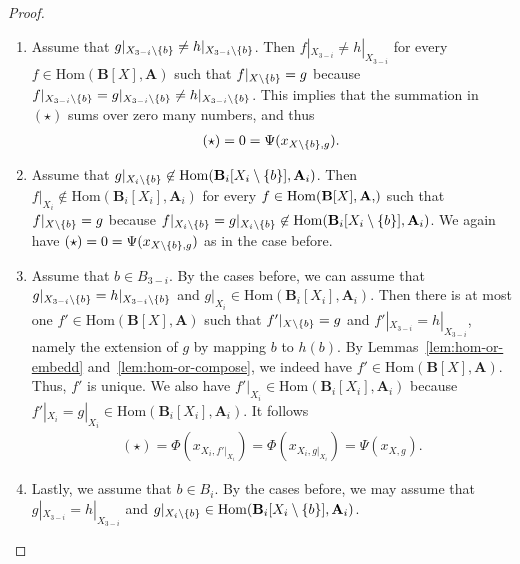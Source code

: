 \documentclass[a4paper,english, thm-restate]{lipics-v2021}
\DeclarePairedDelimiter\set{\lbrace}{\rbrace}
\newcommand{\StructA}{\mathbf{A}}
\newcommand{\StructB}{\mathbf{B}}
\newcommand{\restrict}[2]{#1|_{#2}}
\newcommand{\Hom}[2]{\mathrm{Hom}(#1,#2)}
\begin{document}
\begin{proof}
		\begin{enumerate}
			\item Assume that $\restrict{g}{X_{3-i} \setminus \set{b}} \neq \restrict{h}{X_{3-i}\setminus \set{b}}$.
			Then $\restrict{f}{X_{3-i}} \neq \restrict{h}{X_{3-i}}$
			for every $f \in \Hom{\StructB[X]}{\StructA}$ such that $\restrict{f}{X\setminus \set{b}} = g$ 
			because $\restrict{f}{X_{3-i} \setminus \set{b}} =  \restrict{g}{X_{3-i} \setminus \set{b}} \neq \restrict{h}{X_{3-i}\setminus \set{b}}$. This implies that the summation in $(\star)$ sums over zero many numbers, and thus 
			\begin{align*}
				(\star) = 0 = \Psi(x_{X\setminus \set{b}, g}).
			\end{align*}
			\item Assume that $\restrict{g}{X_i \setminus \set{b}} \not\in \Hom{\StructB_i[X_i \setminus \set{b}]}{\StructA_i}$. Then $\restrict{f}{X_i} \not\in \Hom{\StructB_i[X_i]}{\StructA_i}$
			for every  $f \in \Hom{\StructB[X], \StructA}$ such that $\restrict{f}{X\setminus\set{b}} = g$
			because $\restrict{f}{X_i\setminus \set{b}} = \restrict{g}{X_i \setminus \set{b}} \not\in \Hom{\StructB_i[X_i \setminus \set{b}]}{\StructA_i}$.
			We again have $(\star) = 0 = \Psi(x_{X\setminus \set{b}, g})$ as in the case before.
			\item Assume that $b \in B_{3-i}$.
			By the cases before, we can assume that 
			$\restrict{g}{X_{3-i} \setminus \set{b}}= \restrict{h}{X_{3-i}\setminus \set{b}}$ and $\restrict{g}{X_i} \in \Hom{\StructB_i[X_i]}{\StructA_i}$.
			Then there is at most one $f'\in \Hom{\StructB[X]}{\StructA}$
			such that $\restrict{f'}{X\setminus \set{b}} = g$ and $\restrict{f'}{X_{3-i}} = \restrict{h}{X_{3-i}}$, namely the extension of $g$ by
			mapping $b$ to $h(b)$.
			By Lemmas~\ref{lem:hom-or-embedd} and~\ref{lem:hom-or-compose},
			we indeed have $f'\in \Hom{\StructB[X]}{\StructA}$.
			Thus, $f'$ is unique.
			We also have  $\restrict{f'}{X_i} \in \Hom{\StructB_i[X_i]}{\StructA_i}$
			because $\restrict{f'}{X_i} = \restrict{g}{X_i} \in \Hom{\StructB_i[X_i]}{\StructA_i}$. It follows
			\begin{align*}
				(\star) = \Phi(x_{X_i,\restrict{f'}{X_i}}) = \Phi(x_{X_i,\restrict{g}{X_i}}) = \Psi(x_{X,g}).
			\end{align*}
			\item Lastly, we assume that $b \in B_i$.
			By the cases before, we may assume that 
			$\restrict{g}{X_{3-i}} = \restrict{h}{X_{3-i}}$ and $\restrict{g}{X_i \setminus \set{b}} \in \Hom{\StructB_i[X_i \setminus \set{b}]}{\StructA_i}$.

\end{enumerate}
\end{proof}
\end{document}
